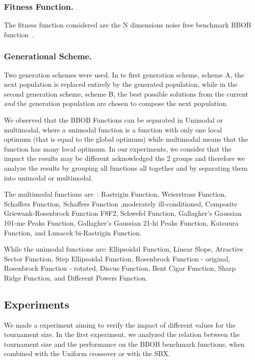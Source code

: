 \subsubsection*{Fitness Function.}
The fitness function considered are the N dimensions noise free benchmark BBOB function~\cite{hansen2010real}.

\subsubsection*{Generational Scheme.}
Two generation schemes were used. In te first generation scheme, scheme A, the next population is replaced entirely by the generated population, while in the second generation scheme, scheme B, the best possible solutions from the current \textit{and} the generation population are chosen to compose the next population.

We observed that the BBOB Functions can be separated in Unimodal or multimodal, where a unimodal function is a function with only one local optimum (that is equal to the global optimum) while multimodal means that the function has many local optimum. In our experiments, we consider that the impact the results may be different acknowledged the 2 groups and therefore we analyze the results by grouping all functions all together and by separating them into unimodal or multimodal. 

The multimodal functions are~\cite{hansen2010real}: Rastrigin Function, Weierstrass Function, Schaffers Function, Schaffers Function ,moderately ill-conditioned, Composite Griewank-Rosenbrock Function F8F2, Schwefel Function, Gallagher's Gaussian 101-me Peaks Function, Gallagher's Gaussian 21-hi Peaks Function, Katsuura Function, and Lunacek bi-Rastrigin Function.

While the unimodal functions are: Ellipsoidal Function, Linear Slope, Atractive Sector Function,  Step Ellipsoidal Function, Rosenbrock Function - original, Rosenbrock Function - rotated, Discus Function, Bent Cigar Function, Sharp Ridge Function, and Different Powers Function.

\label{sec:experiment}

\subsection{Experiments}
We made a experiment aiming to verify the impact of different values for the tournament size. In the first experiment, we analyzed the relation between the tournament size and the performance on the BBOB benchmark functions, when combined with the Uniform crossover or with the SBX. 

